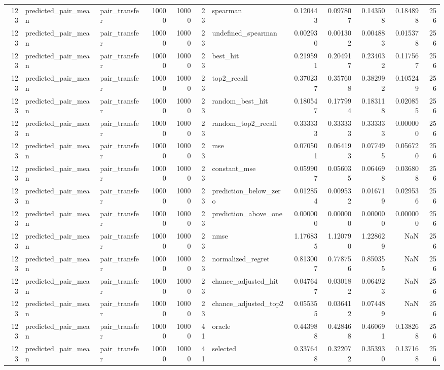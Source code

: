 \begin{tabular}{rllrrrlrrrrr}
123 & predicted_pair_mean & pair_transfer & 10000 & 10000 & 23 & spearman & 0.120443 & 0.097807 & 0.143508 & 0.184898 & 256 \\
123 & predicted_pair_mean & pair_transfer & 10000 & 10000 & 23 & undefined_spearman & 0.002930 & 0.001302 & 0.004883 & 0.015378 & 256 \\
123 & predicted_pair_mean & pair_transfer & 10000 & 10000 & 23 & best_hit & 0.219591 & 0.204917 & 0.234032 & 0.117567 & 256 \\
123 & predicted_pair_mean & pair_transfer & 10000 & 10000 & 23 & top2_recall & 0.370237 & 0.357608 & 0.382992 & 0.105249 & 256 \\
123 & predicted_pair_mean & pair_transfer & 10000 & 10000 & 23 & random_best_hit & 0.180547 & 0.177994 & 0.183118 & 0.020855 & 256 \\
123 & predicted_pair_mean & pair_transfer & 10000 & 10000 & 23 & random_top2_recall & 0.333333 & 0.333333 & 0.333333 & 0.000000 & 256 \\
123 & predicted_pair_mean & pair_transfer & 10000 & 10000 & 23 & mse & 0.070501 & 0.064193 & 0.077495 & 0.056720 & 256 \\
123 & predicted_pair_mean & pair_transfer & 10000 & 10000 & 23 & constant_mse & 0.059907 & 0.056035 & 0.064698 & 0.036808 & 256 \\
123 & predicted_pair_mean & pair_transfer & 10000 & 10000 & 23 & prediction_below_zero & 0.012854 & 0.009532 & 0.016719 & 0.029536 & 256 \\
123 & predicted_pair_mean & pair_transfer & 10000 & 10000 & 23 & prediction_above_one & 0.000000 & 0.000000 & 0.000000 & 0.000000 & 256 \\
123 & predicted_pair_mean & pair_transfer & 10000 & 10000 & 23 & nmse & 1.176835 & 1.120790 & 1.228629 & NaN & 256 \\
123 & predicted_pair_mean & pair_transfer & 10000 & 10000 & 23 & normalized_regret & 0.813007 & 0.778756 & 0.850355 & NaN & 256 \\
123 & predicted_pair_mean & pair_transfer & 10000 & 10000 & 23 & chance_adjusted_hit & 0.047647 & 0.030182 & 0.064923 & NaN & 256 \\
123 & predicted_pair_mean & pair_transfer & 10000 & 10000 & 23 & chance_adjusted_top2 & 0.055355 & 0.036412 & 0.074489 & NaN & 256 \\
123 & predicted_pair_mean & pair_transfer & 10000 & 10000 & 41 & oracle & 0.443988 & 0.428468 & 0.460691 & 0.138268 & 256 \\
123 & predicted_pair_mean & pair_transfer & 10000 & 10000 & 41 & selected & 0.337648 & 0.322072 & 0.353930 & 0.137168 & 256 \\

\end{tabular}
